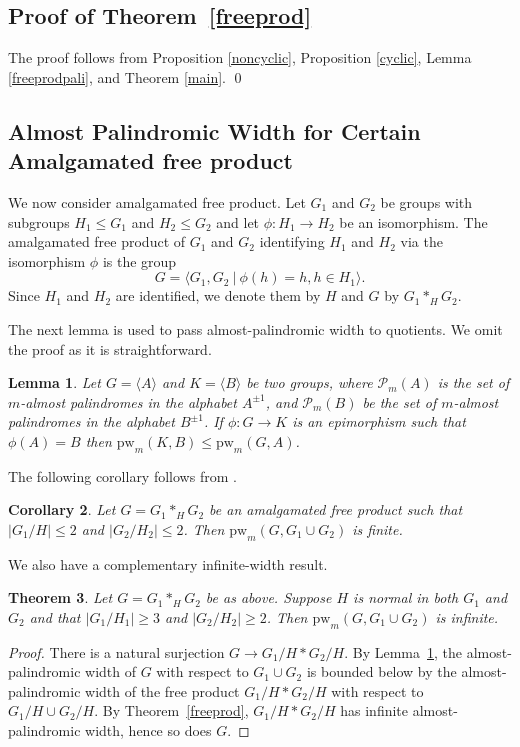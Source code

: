 \documentclass[12pt]{amsart}
\newtheorem{theorem}{Theorem}[section]
\newtheorem{lemma}[theorem]{Lemma}
\newtheorem{cor}[theorem]{Corollary}
\theoremstyle{definition}
\theoremstyle{remark}
\numberwithin{equation}{subsection}
\theoremstyle{plain}
\numberwithin{equation}{section}
\begin{document}
\subsection{Proof of Theorem~\ref{freeprod}} The proof follows from Proposition \ref{noncyclic}, Proposition  \ref{cyclic}, Lemma \ref{freeprodpali}, and Theorem \ref{main}.
\qed


\subsection{Almost Palindromic Width for Certain Amalgamated free product}


We now consider amalgamated free product. Let $G_1$ and $G_2$ be  groups with subgroups $H_1 \leq G_1$ and $H_2 \leq G_2$ and let $\phi : H_1 \longrightarrow H_2$ be an isomorphism. The amalgamated free product of $G_1$ and $G_2$ identifying $H_1$ and $H_2$ via the isomorphism $\phi$ is the group $$G= \langle G_1, G_2 ~|~ \phi(h) = h, h \in H_1 \rangle.$$ 
Since $H_1$ and $H_2$ are identified, we denote them by $H$ and $G$ by $G_1 *_H G_2$.

The next lemma is used to pass almost-palindromic width to quotients. We omit the proof as it is straightforward.
\begin{lemma}\label{epi}
    Let $G = \langle A \rangle$ and $K = \langle B \rangle$ be two groups, where $\mathcal{P}_m(A)$ is the set of $m$-almost palindromes in the alphabet $A^{\pm 1}$, and $\mathcal{P}_m(B)$ be the set of $m$-almost palindromes in the alphabet $B^{\pm 1}$. If $\phi : G \longrightarrow K$ is an epimorphism such that $\phi(A) = B$ then $\mathrm{pw}_m(K,B) \leq  \mathrm{pw}_m(G,A)$.
\end{lemma}
 The following corollary follows from \cite[Proposition~3.13]{GK}.

 \begin{cor}
     Let $G = G_1*_H G_2$ be an amalgamated free product such that $|G_1/H| \leq 2$ and $|G_2/H_2 | \leq 2$. Then $\mathrm{pw}_m(G, G_1 \cup G_2)$ is finite.
 \end{cor}
We also have a complementary infinite-width result. 
\begin{theorem}
      Let $G = G_1 *_H G_2$ be as above. Suppose $H$ is normal in both $G_1$ and $G_2$ and that $|G_1/H_1| \geq 3$ and $|G_2/H_2 | \geq 2$. Then $\mathrm{pw}_m(G, G_1 \cup G_2)$ is infinite.
\end{theorem}

\begin{proof}
    There is a natural surjection $G \to {G_1}/{H}*{G_2}/{H}$. By Lemma~\ref{epi}, the almost-palindromic width of $G$ with respect to $G_1 \cup G_2$ is bounded below by the almost-palindromic width of the free product ${G_1}/{H}*{G_2}/{H}$ with respect to ${G_1}/{H} \cup {G_2}/{H}$. By Theorem~\ref{freeprod},  ${G_1}/{H}*{G_2}/{H}$ has infinite almost-palindromic width, hence so does $G$.
\end{proof}
\end{document}
